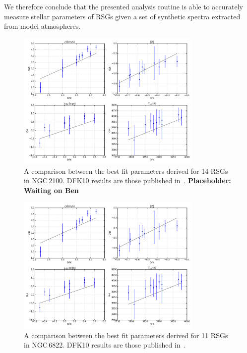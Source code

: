 We therefore conclude that the presented analysis routine is able to accurately measure stellar parameters of RSGs given a set of synthetic spectra extracted from model atmospheres.
\begin{figure}
 \centering
 \includegraphics[width=0.80\textwidth]{JAnal/NGC6822-par-compare}
 \caption[NGC\,2100 DFK10 best fit parameter comparison]{
A comparison between the best fit parameters derived for 14 RSGs in NGC\,2100.
DFK10 results are those published in~\cite{2016arXiv160202702P}.
\textbf{Placeholder: Waiting on Ben}
\label{fig:n2100DFK}
         }
\end{figure}

\begin{figure}
 \centering
 \includegraphics[width=0.80\textwidth]{JAnal/NGC6822-par-compare}
 \caption[NGC\,6822 DFK10 best fit parameter comparison]{
A comparison between the best fit parameters derived for 11 RSGs in NGC\,6822.
DFK10 results are those published in~\cite{2015ApJ...803...14P}.
\label{fig:n6822DFK}
         }
\end{figure}

